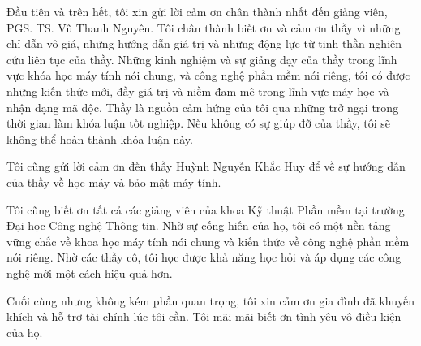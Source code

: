 
\begin{acknowledgements}      

Đầu tiên và trên hết, tôi xin gửi lời cảm ơn chân thành nhất đến giảng viên, PGS. TS. Vũ Thanh Nguyên. Tôi chân thành biết ơn và cảm ơn thầy vì những chỉ dẫn vô giá, những hướng dẫn giá trị và những động lực từ tinh thần nghiên cứu liên tục của thầy. Những kinh nghiệm và sự giảng dạy của thầy trong lĩnh vực khóa học máy tính nói chung, và công nghệ phần mềm nói riêng, tôi có được những kiến thức mới, đầy giá trị và niềm đam mê trong lĩnh vực máy học và nhận dạng mã độc. Thầy là nguồn cảm hứng của tôi qua những trở ngại trong thời gian làm khóa luận tốt nghiệp. Nếu không có sự giúp đỡ của thầy, tôi sẽ không thể hoàn thành khóa luận này.

Tôi cũng gửi lời cảm ơn đến thầy Huỳnh Nguyễn Khắc Huy để về sự hướng dẫn của thầy về học máy và bảo mật máy tính.

Tôi cũng biết ơn tất cả các giảng viên của khoa Kỹ thuật Phần mềm tại trường Đại học Công nghệ Thông tin. Nhờ sự cống hiến của họ, tôi có một nền tảng vững chắc về khoa học máy tính nói chung và kiến thức về công nghệ phần mềm nói riêng. Nhờ các thầy cô, tôi học được khả năng học hỏi và áp dụng các công nghệ mới một cách hiệu quả hơn.

Cuối cùng nhưng không kém phần quan trọng, tôi xin cảm ơn gia đình đã khuyến khích và hỗ trợ tài chính lúc tôi cần. Tôi mãi mãi biết ơn tình yêu vô điều kiện của họ.

\end{acknowledgements}
